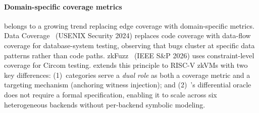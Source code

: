 \begin{table}[t]
\caption{Comparison of zkVM vulnerability detection approaches.}
\label{tbl:approach-comparison}
\centering
{}
\end{table}

\paragraph{Domain-specific coverage metrics}
\tool belongs to a growing trend replacing edge coverage with domain-specific metrics. Data Coverage~\cite{datacoverage} (USENIX Security 2024) replaces code coverage with data-flow coverage for database-system testing, observing that bugs cluster at specific data patterns rather than code paths. zkFuzz~\cite{zkfuzz} (IEEE S\&P 2026) uses constraint-level coverage for Circom testing. \tool extends this principle to RISC-V zkVMs with two key differences: (1)~categories serve a \emph{dual role} as both a coverage metric and a targeting mechanism (anchoring witness injection); and (2)~\tool's differential oracle does not require a formal specification, enabling it to scale across six heterogeneous backends without per-backend symbolic modeling.

